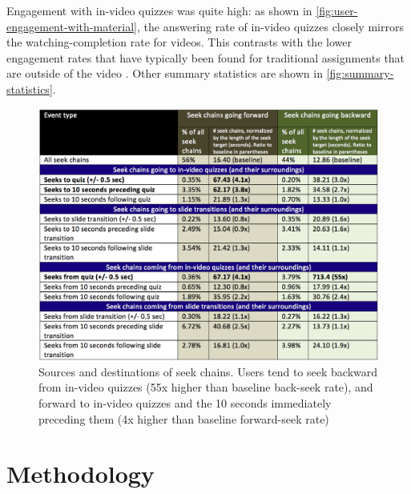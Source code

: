 \documentclass{sigchi}
\begin{document}
Engagement with in-video quizzes was quite high: as shown in \autoref{fig:user-engagement-with-material}, the answering rate of in-video quizzes closely mirrors the watching-completion rate for videos. This contrasts with the lower engagement rates that have typically been found for traditional assignments that are outside of the video \cite{renedisengagement} \cite{ashton}. Other summary statistics are shown in \autoref{fig:summary-statistics}.


\begin{figure}
\includegraphics[width=1.0\columnwidth]{seek-sources-and-destinations-table}
\caption{Sources and destinations of seek chains. Users tend to seek backward from in-video quizzes (55x higher than baseline back-seek rate), and forward to in-video quizzes and the 10 seconds immediately preceding them (4x higher than baseline forward-seek rate)}
\label{fig:seek-sources-and-destinations-table}
\end{figure}

\section{Methodology}
\end{document}
